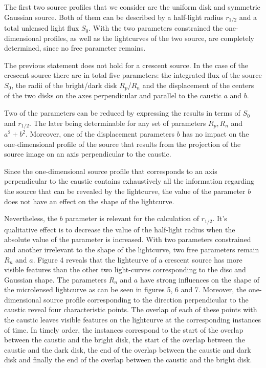 \documentclass[usenatbib]{mn2e}
\begin{document}
The first two source profiles that we consider are the uniform disk and symmetric Gaussian source. 
Both of them can be described by a half-light radius $r_{1/2}$ and a total unlensed light flux $S_0$. 
With the two parameters constrained the one-dimensional profiles, as well as the lightcurves of the two source, are completely determined, since no free parameter remains. 

The previous statement does not hold for a crescent source.
In the case of the crescent source there are in total five parameters: the integrated flux of the source $S_0$,
 the radii of the bright/dark disk $R_p$/$R_n$ and the displacement of the centers of the two disks on the axes perpendicular and parallel to the caustic $a$ and $b$. 

Two of the parameters can be reduced by expressing the results in terms of $S_0$ and $r_{1/2}$. 
The later being determinable for any set of parameters $R_p, R_n$ and $a^2+b^2$. Moreover, one of the displacement 
parameters $b$ has no impact on the one-dimensional profile of the source that results from the projection of the source image on an axis perpendicular to the caustic. 

Since the one-dimensional source profile that corresponds to an axis perpendicular to the caustic contains exhaustively all the information regarding the source that can be revealed by the lightcurve, 
the value of the parameter $b$ does not have an effect on the shape of the lightcurve. 

Nevertheless, the $b$ parameter is relevant for the calculation of $r_{1/2}$. 
It's qualitative effect is to decrease the value of the half-light radius when the absolute value of the parameter is increased.  
With two parameters constrained and another irrelevant to the shape of the lightcurve, two free parameters remain $R_n$ and $a$. 
Figure 4 reveals that the lightcurve of a crescent source has more visible features than the other two light-curves 
corresponding to the disc and Gaussian shape. The parameters $R_n$ and $a$ have strong influences on the shape of 
the microlensed lightcurve as can be seen in figures 5, 6 and 7. Moreover, the one-dimensional source profile corresponding to the direction perpendicular to the caustic reveal four characteristic points. The overlap of each of these points with the caustic leaves visible features on the lightcurve at the corresponding instances of time. In timely order, the instances correspond to the start of the overlap between the caustic and the bright disk, the start of the overlap between the caustic and the dark disk, the end of the overlap between the caustic and dark disk and finally the end of the overlap between the caustic and the bright disk.          
\end{document}
